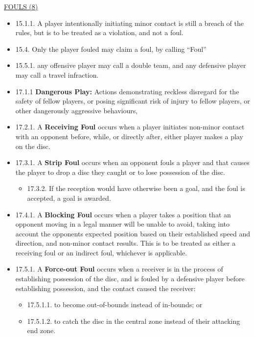 \begin{center}\underline{\uppercase{fouls (8)}}\end{center}
    \begin{itemize}[noitemsep]
    \tiny

    \item 15.1.1. A player intentionally initiating minor contact is still a breach of the rules, but is to be treated as a violation, and not a foul.
    \item 15.4. Only the player fouled may claim a foul, by calling “Foul”
    \item 15.5.1. any offensive player may call a double team, and any defensive player may call a travel infraction.
    \item 17.1.1 \textbf{Dangerous Play:} Actions demonstrating reckless disregard for the safety of fellow players, or posing significant risk of injury to fellow players, or other dangerously aggressive behaviours,
    \item 17.2.1. A \textbf{Receiving Foul} occurs when a player initiates non-minor contact with an opponent before, while, or directly after, either player makes a play on the disc.
    \item 17.3.1. A \textbf{Strip Foul} occurs when an opponent fouls a player and that causes the player to drop a disc they caught or to lose possession of the disc.
        \begin{itemize}
            \item 17.3.2. If the reception would have otherwise been a goal, and the foul is accepted, a goal is awarded.
        \end{itemize}
    \item 17.4.1. A \textbf{Blocking Foul} occurs when a player takes a position that an opponent moving in a legal manner will be unable to avoid, taking into account the opponents expected position based on their established speed and direction, and non-minor contact results. This is to be treated as either a receiving foul or an indirect foul, whichever is applicable.
    \item 17.5.1. A \textbf{Force-out Foul} occurs when a receiver is in the process of establishing possession of the disc, and is fouled by a defensive player before establishing possession, and the contact caused the receiver:
        \begin{itemize}
            \item 17.5.1.1. to become out-of-bounds instead of in-bounds; or
            \item 17.5.1.2. to catch the disc in the central zone instead of their attacking end zone.

\end{itemize}
\end{itemize}
